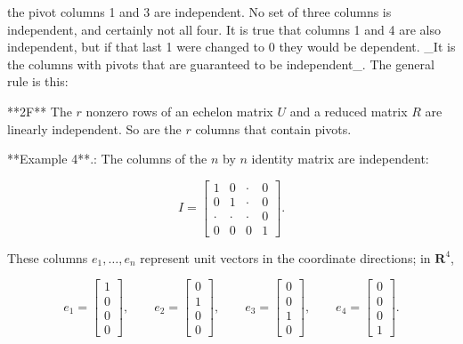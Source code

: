 the pivot columns 1 and 3 are independent. No set of three columns is independent, and certainly not all four. It is true that columns 1 and 4 are also independent, but if that last 1 were changed to 0 they would be dependent. _It is the columns with pivots that are guaranteed to be independent_. The general rule is this:

**2F** The \(r\) nonzero rows of an echelon matrix \(U\) and a reduced matrix \(R\) are linearly independent. So are the \(r\) columns that contain pivots.

**Example 4**.: The columns of the \(n\) by \(n\) identity matrix are independent:

\[I=\begin{bmatrix}1&0&\cdot&0\\ 0&1&\cdot&0\\ \cdot&\cdot&\cdot&0\\ 0&0&0&1\end{bmatrix}.\]

These columns \(e_{1},\ldots,e_{n}\) represent unit vectors in the coordinate directions; in \(\mathbf{R}^{4}\),

\[e_{1}=\begin{bmatrix}1\\ 0\\ 0\\ 0\end{bmatrix},\qquad e_{2}=\begin{bmatrix}0\\ 1\\ 0\\ 0\end{bmatrix},\qquad e_{3}=\begin{bmatrix}0\\ 0\\ 1\\ 0\end{bmatrix},\qquad e_{4}=\begin{bmatrix}0\\ 0\\ 0\\ 1\end{bmatrix}.\] 